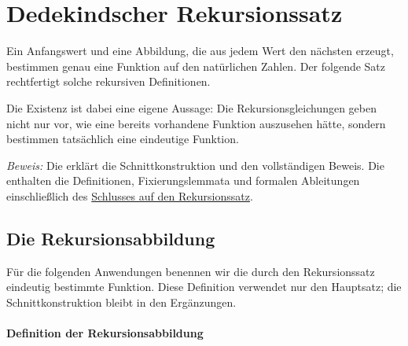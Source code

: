 \documentclass[main.tex]{subfiles}
\begin{document}
\section{Dedekindscher Rekursionssatz}

Ein Anfangswert und eine Abbildung, die aus jedem Wert den nächsten
erzeugt, bestimmen genau eine Funktion auf den natürlichen Zahlen.
Der folgende Satz rechtfertigt solche rekursiven Definitionen.


Die Existenz ist dabei eine eigene Aussage: Die Rekursionsgleichungen
geben nicht nur vor, wie eine bereits vorhandene Funktion auszusehen
hätte, sondern bestimmen tatsächlich eine eindeutige Funktion.

\noindent\emph{Beweis:} Die \DedekindReadingLink{} erklärt die
Schnittkonstruktion und den vollständigen Beweis. Die
\DedekindProofsLink{} enthalten die Definitionen, Fixierungslemmata
und formalen Ableitungen einschließlich des
\href{\DedekindEditionDirectory_B10-dedekind-proofs.pdf\#dedekind.proof}%
  {Schlusses auf den Rekursionssatz}.

\subsection{Die Rekursionsabbildung}

Für die folgenden Anwendungen benennen wir die durch den Rekursionssatz
eindeutig bestimmte Funktion. Diese Definition verwendet nur den
Hauptsatz; die Schnittkonstruktion bleibt in den Ergänzungen.

\paragraph{Definition der Rekursionsabbildung}

\end{document}

